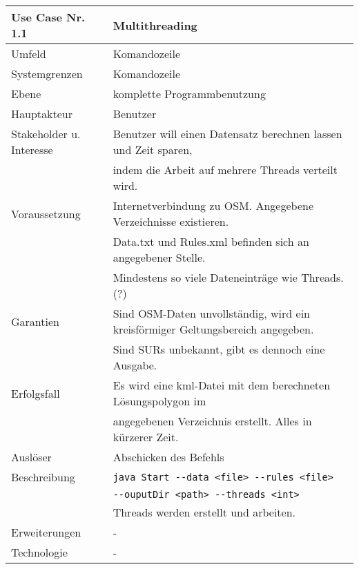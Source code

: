 \begin{tabular}{| l | l |}
 \hline
 \textbf{Use Case Nr. 1.1} & Multithreading\\
 \hline
 Umfeld & Komandozeile\\
 \hline
 Systemgrenzen & Komandozeile\\
 \hline
 Ebene & komplette Programmbenutzung\\
 \hline
 Hauptakteur & Benutzer\\
 \hline
 Stakeholder u. Interesse & Benutzer will einen Datensatz berechnen lassen und Zeit sparen,\\
			  & indem die Arbeit auf mehrere Threads verteilt wird.\\
 \hline
 Voraussetzung & Internetverbindung zu OSM. Angegebene Verzeichnisse existieren.\\
	      & Data.txt und Rules.xml befinden sich an angegebener Stelle. \\
	      & Mindestens so viele Dateneinträge wie Threads. (?)\\
 \hline
 Garantien & Sind OSM-Daten unvollständig, wird ein kreisförmiger Geltungsbereich angegeben.\\
	  & Sind SURs unbekannt, gibt es dennoch eine Ausgabe.\\
 \hline
 Erfolgsfall & Es wird eine kml-Datei mit dem berechneten Lösungspolygon im\\
	    & angegebenen Verzeichnis erstellt. Alles in kürzerer Zeit.\\
 \hline
 Auslöser & Abschicken des Befehls\\
 \hline
 Beschreibung & \verb|java Start --data <file> --rules <file>|\\
	      & \hspace{24pt}\verb|--ouputDir <path> --threads <int>|\\
	      & Threads werden erstellt und arbeiten.\\
 \hline
 Erweiterungen & -\\
 \hline
 Technologie & -\\
 \hline
\end{tabular}




